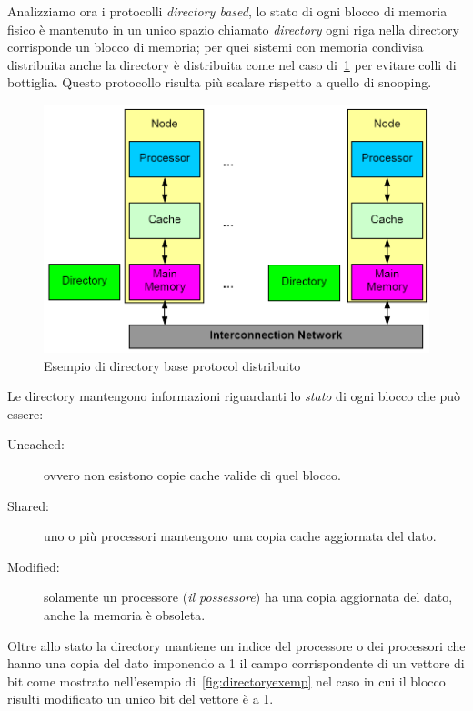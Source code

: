 Analizziamo ora i protocolli \emph{directory based}, lo stato di ogni blocco di memoria fisico è mantenuto in un unico spazio chiamato \emph{directory} ogni riga nella directory corrisponde un blocco di memoria; per quei sistemi con memoria condivisa distribuita anche la directory è distribuita come nel caso di \figurename\,\ref{fig:directorydist} per evitare colli di bottiglia. Questo protocollo risulta più scalare rispetto a quello di snooping. 
\begin{figure}[htb]
\centering
\includegraphics[scale=0.5]{img/directorydist.png}
\caption{Esempio di directory base protocol distribuito}\label{fig:directorydist}
\end{figure}
Le directory mantengono informazioni riguardanti lo \emph{stato} di ogni blocco che può essere:
\begin{description}
\item[Uncached:] ovvero non esistono copie cache valide di quel blocco.
\item[Shared:] uno o più processori mantengono una copia cache aggiornata del dato.
\item[Modified:] solamente un processore (\emph{il possessore}) ha una copia aggiornata del dato, anche la memoria è obsoleta.
\end{description}
Oltre allo stato la directory mantiene un indice del processore o dei processori che hanno una copia del dato imponendo a 1 il campo corrispondente di un vettore di bit come mostrato nell'esempio di \figurename\,\ref{fig:directoryexemp} nel caso in cui il blocco risulti modificato un unico bit del vettore è a 1.
